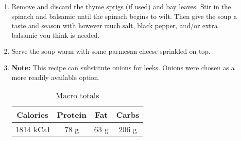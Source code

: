 \begin{multicols}{2}
\begin{enumerate}
\item Remove and discard the thyme sprigs (if used) and bay leaves.  Stir in the spinach and balsamic until the spinach begins to wilt.  Then give the soup a taste and season with however much salt, black pepper, and/or extra balsamic you think is needed.

\item Serve the soup warm with some parmesan cheese sprinkled on top.
\item \textbf{Note:} This recipe can substitute onions for leeks. Onions were chosen as a more readily available option. 



\begin{table}[H]
  \begin{center}
    \caption{Macro totals}
    \label{tab:table1}
    \begin{tabular}{c|c|c|c} %
      \textbf{Calories} & \textbf{Protein} & \textbf{Fat} & \textbf{Carbs}\\
      \hline
      1814 kCal & 78 g & 63 g & 206 g\\
    \end{tabular}
  \end{center}
\end{table}
 
\end{enumerate}
\end{multicols}
